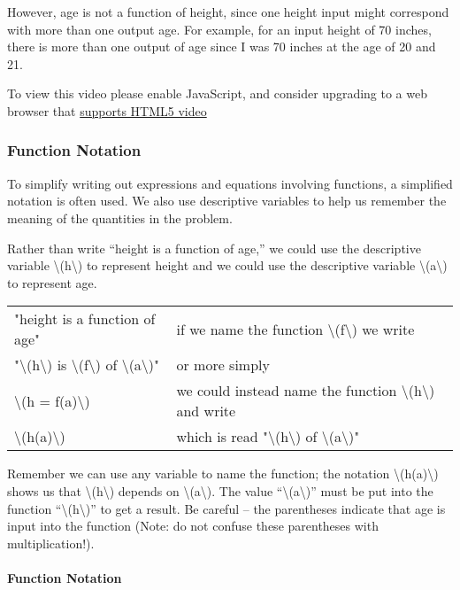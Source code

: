 However, age is not a function of height, since one height input might
correspond with more than one output age. For example, for an input
height of 70 inches, there is more than one output of age since I was 70
inches at the age of 20 and 21.

To view this video please enable JavaScript, and consider upgrading to a
web browser that \href{http://videojs.com/html5-video-support/}{supports
HTML5 video}

\hypertarget{function-notation}{%
\subsubsection{Function Notation}\label{function-notation}}

To simplify writing out expressions and equations involving functions, a
simplified notation is often used. We also use descriptive variables to
help us remember the meaning of the quantities in the problem.

Rather than write ``height is a function of age,'' we could use the
descriptive variable \textbackslash{}(h\textbackslash{}) to represent
height and we could use the descriptive variable
\textbackslash{}(a\textbackslash{}) to represent age.

\begin{longtable}[]{@{}ll@{}}
\toprule
\endhead
"height is a function of age" & if we name the function
\textbackslash{}(f\textbackslash{}) we write\tabularnewline
"\textbackslash{}(h\textbackslash{}) is
\textbackslash{}(f\textbackslash{}) of
\textbackslash{}(a\textbackslash{})" & or more simply\tabularnewline
\textbackslash{}(h = f(a)\textbackslash{}) & we could instead name the
function \textbackslash{}(h\textbackslash{}) and write\tabularnewline
\textbackslash{}(h(a)\textbackslash{}) & which is read
"\textbackslash{}(h\textbackslash{}) of
\textbackslash{}(a\textbackslash{})"\tabularnewline
\bottomrule
\end{longtable}

Remember we can use any variable to name the function; the notation
\textbackslash{}(h(a)\textbackslash{}) shows us that
\textbackslash{}(h\textbackslash{}) depends on
\textbackslash{}(a\textbackslash{}). The value
``\textbackslash{}(a\textbackslash{})'' must be put into the function
``\textbackslash{}(h\textbackslash{})'' to get a result. Be careful --
the parentheses indicate that age is input into the function (Note: do
not confuse these parentheses with multiplication!).

\hypertarget{function-notation-1}{%
\paragraph{Function Notation}\label{function-notation-1}}

